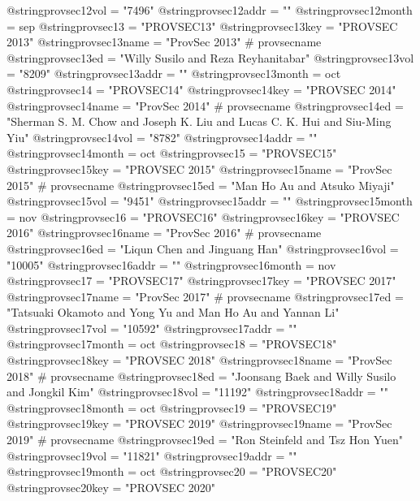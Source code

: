 @string{provsec12vol =          "7496"}
@string{provsec12addr =         ""}
@string{provsec12month =        sep}
@string{provsec13 =             "PROVSEC13"}
@string{provsec13key =          "PROVSEC 2013"}
@string{provsec13name =         "ProvSec 2013" # provsecname}
@string{provsec13ed =           "Willy Susilo and Reza Reyhanitabar"}
@string{provsec13vol =          "8209"}
@string{provsec13addr =         ""}
@string{provsec13month =        oct}
@string{provsec14 =             "PROVSEC14"}
@string{provsec14key =          "PROVSEC 2014"}
@string{provsec14name =         "ProvSec 2014" # provsecname}
@string{provsec14ed =           "Sherman S. M. Chow and Joseph K. Liu and Lucas C. K. Hui and Siu-Ming Yiu"}
@string{provsec14vol =          "8782"}
@string{provsec14addr =         ""}
@string{provsec14month =        oct}
@string{provsec15 =             "PROVSEC15"}
@string{provsec15key =          "PROVSEC 2015"}
@string{provsec15name =         "ProvSec 2015" # provsecname}
@string{provsec15ed =           "Man Ho Au and Atsuko Miyaji"}
@string{provsec15vol =          "9451"}
@string{provsec15addr =         ""}
@string{provsec15month =        nov}
@string{provsec16 =             "PROVSEC16"}
@string{provsec16key =          "PROVSEC 2016"}
@string{provsec16name =         "ProvSec 2016" # provsecname}
@string{provsec16ed =           "Liqun Chen and Jinguang Han"}
@string{provsec16vol =          "10005"}
@string{provsec16addr =         ""}
@string{provsec16month =        nov}
@string{provsec17 =             "PROVSEC17"}
@string{provsec17key =          "PROVSEC 2017"}
@string{provsec17name =         "ProvSec 2017" # provsecname}
@string{provsec17ed =           "Tatsuaki Okamoto and Yong Yu and Man Ho Au and Yannan Li"}
@string{provsec17vol =          "10592"}
@string{provsec17addr =         ""}
@string{provsec17month =        oct}
@string{provsec18 =             "PROVSEC18"}
@string{provsec18key =          "PROVSEC 2018"}
@string{provsec18name =         "ProvSec 2018" # provsecname}
@string{provsec18ed =           "Joonsang Baek and Willy Susilo and Jongkil Kim"}
@string{provsec18vol =          "11192"}
@string{provsec18addr =         ""}
@string{provsec18month =        oct}
@string{provsec19 =             "PROVSEC19"}
@string{provsec19key =          "PROVSEC 2019"}
@string{provsec19name =         "ProvSec 2019" # provsecname}
@string{provsec19ed =           "Ron Steinfeld and Tsz Hon Yuen"}
@string{provsec19vol =          "11821"}
@string{provsec19addr =         ""}
@string{provsec19month =        oct}
@string{provsec20 =             "PROVSEC20"}
@string{provsec20key =          "PROVSEC 2020"}
